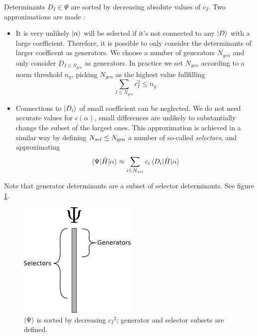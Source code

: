 \documentclass[./thesis.tex]{subfiles}
\begin{document}
Determinants $D_I \in \Psi$ are sorted by decreasing absolute values of $c_I$. Two approximations are made :

\begin{itemize}
\item
It is very unlikely $\ket \alpha$ will be selected if it's not connected to any $\ket D$ with a large coefficient. Therefore, it is possible to only consider the determinants of larger coefficent as generators. We choose a number of generators $N_{gen}$ and only consider $D_{I \leq N_{gen}}$ as generators. In practice we set $N_{gen}$ according to a norm threshold $n_g$, picking $N_{gen}$ as the highest value fullfilling
\begin{equation}
\sum_{I \leq N_{gen}} c_I^2 \leq n_g
\end{equation}
\item
Connections to $\ket {D_i}$ of small coefficient can be neglected. We do not need accurate values for $\epsilon(\alpha)$, small differences are unlikely to substantially change the subset of the largest ones. This approximation is achieved in a similar way by defining $N_{sel} \leq {N_\text{gen}}$ a number of so-called \emph{selectors}, and approximating
\begin{equation}
  \mel{\Psi}{\hat{H}}{\alpha} \approx \sum_{i \leq N_{sel}} c_i \mel{D_i}{\hat{H}}{\alpha}
\end{equation}

\end{itemize}

Note that generator determinants are a subset of selector determinants. See figure \ref{fig:generators_selectors}.


\begin{figure}[h!]
	
	\begin{center}
		\includegraphics[width=0.4\columnwidth]{figures/cipsi/selexemple2}
		\caption{$\ket \Psi$ is sorted by decreasing ${c_I}^2$; generator and selector subsets are defined.}
		\label{fig:generators_selectors}
	\end{center}
\end{figure}
\end{document}
